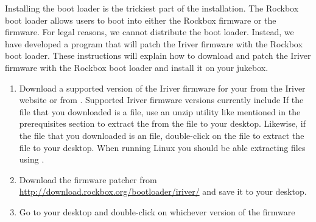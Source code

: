 
  Installing the boot loader is the trickiest part of the installation.
  The Rockbox boot loader allows users to boot into either the Rockbox 
  firmware or the \playerman{} firmware. For legal reasons, we cannot distribute 
  the boot loader. Instead, we have developed a program that will patch the 
  Iriver firmware with the Rockbox boot loader. These instructions will explain 
  how to download and patch the Iriver firmware with the Rockbox boot loader 
  and install it on your jukebox.


\begin{enumerate}
  \item Download a supported version of the Iriver firmware for your 
  \playername{} from the Iriver website or from 
  .
  Supported Iriver firmware versions currently include 
  If the file that you downloaded is a  file, use an unzip 
  utility like mentioned in the prerequisites section to extract
  the  from the  file
  to your desktop. Likewise, if the file that you downloaded is an 
   file, double-click on the  file to extract 
  the  file to your desktop.
  When running Linux you should be able extracting 
  files using .
  \item Download the firmware patcher  from 
  \url{http://download.rockbox.org/bootloader/iriver/} and save it to your desktop.
  \item Go to your desktop and double-click on whichever version of the firmware 

\end{enumerate}
